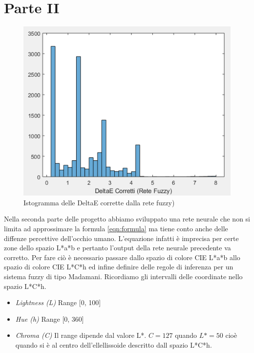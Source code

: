 \chapter{Parte II}

\begin{figure}
\begin{center}
	\includegraphics[scale=0.8]{images/rete2-istogramma-deltaecorretti.PNG}
\end{center}
\caption{Istogramma delle DeltaE corrette dalla rete fuzzy)}
\end{figure}

Nella seconda parte delle progetto abbiamo sviluppato una rete neurale che non si limita ad approssimare la formula \ref{eqn:formula} ma tiene conto anche delle diffenze percettive dell'occhio umano. L'equazione infatti è imprecisa per certe zone dello spazio L*a*b e pertanto l'output della rete neurale precedente va corretto. Per fare ciò è necessario passare dallo spazio di colore CIE L*a*b allo spazio di colore CIE L*C*h ed infine definire delle regole di inferenza per un sistema fuzzy di tipo Madamani.
Ricordiamo gli intervalli delle coordinate nello spazio L*C*h.
\begin{itemize}
	\item \textit{Lightness (L)} Range [0, 100]
	\item \textit{Hue (h)} Range  [0, 360\textdegree] 
    \item \textit{Chroma (C)} Il range dipende dal valore L*. \(C= 127\) quando \(L*=50\) cioè quando si è al centro dell'ellellissoide descritto dall spazio L*C*h.
\end{itemize}